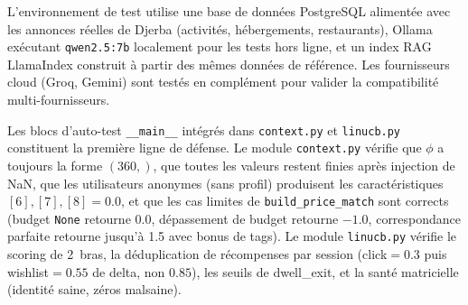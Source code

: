 L'environnement de test utilise une base de données PostgreSQL alimentée avec les annonces
réelles de Djerba (activités, hébergements, restaurants), Ollama exécutant \texttt{qwen2.5:7b}
localement pour les tests hors ligne, et un index RAG LlamaIndex construit à partir des mêmes
données de référence. Les fournisseurs cloud (Groq, Gemini) sont testés en complément pour
valider la compatibilité multi-fournisseurs.

Les blocs d'auto-test \texttt{\_\_main\_\_} intégrés dans \texttt{context.py} et
\texttt{linucb.py} constituent la première ligne de défense. Le module \texttt{context.py}
vérifie que $\phi$ a toujours la forme $(360,)$, que toutes les valeurs restent finies après
injection de NaN, que les utilisateurs anonymes (sans profil) produisent les caractéristiques
$[6], [7], [8] = 0.0$, et que les cas limites de \texttt{build\_price\_match} sont corrects
(budget \texttt{None} retourne 0.0, dépassement de budget retourne $-1.0$, correspondance
parfaite retourne jusqu'à 1.5 avec bonus de tags). Le module \texttt{linucb.py} vérifie le
scoring de 2~bras, la déduplication de récompenses par session (click$=0.3$ puis
wishlist$=0.55$ de delta, non $0.85$), les seuils de dwell\_exit, et la santé matricielle
(identité saine, zéros malsaine).

